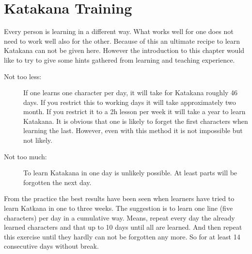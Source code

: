 \chapter{Katakana Training}\label{chap:KatakanaTraining}

\normalsize

Every person is learning in a different way. What works well for one does not
need to work well also for the other. Because of this an ultimate recipe to
learn Katakana can not be given here. However the introduction to this chapter
would like to try to give some  hints gathered from learning and teaching
experience. 

\begin{description}

\item[Not too less:] If one learns one character per day, it will take for
Katakana roughly 46 days.  If you restrict this to working days it will take
approximately two month. If you restrict it to a 2h lesson per week it will
take a year to learn Katakana. It is obvious that one is likely to forget the
first characters when learning the last. However, even with this method it is
not impossible but not likely.

\item[Not too much:]  To learn Katakana in one day is unlikely possible. At
least parts will be forgotten the next day.

\end{description}

From the practice the best results have been seen when learners have tried to
learn Katkana in one to three weeks. The suggestion is to learn one line (five
characters) per day in a cumulative way. Means, repeat every day the already
learned characters and that up to 10 days until all are learned. And then
repeat this exercise until they hardly can not be forgotten any more. So for
at least 14 consecutive days without break. 

